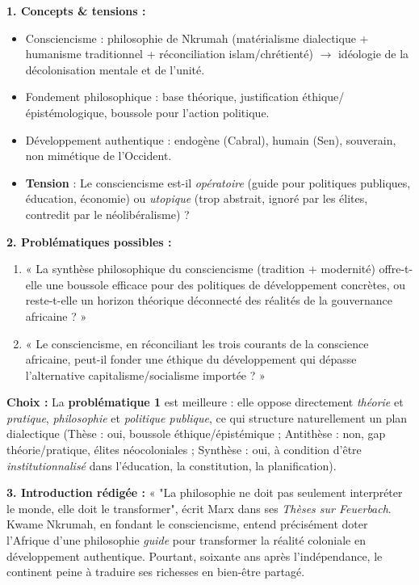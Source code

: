 \documentclass[11pt]{article}
\newcommand{\cle}[1]{{\popxbold\color{popdark}#1}}
\begin{document}
\begin{corrige}
\textbf{1. Concepts \& tensions :}
\begin{itemize}
    \item \cle{Consciencisme} : philosophie de Nkrumah (matérialisme dialectique + humanisme traditionnel + réconciliation islam/chrétienté) $\rightarrow$ idéologie de la décolonisation mentale et de l'unité.
    \item \cle{Fondement philosophique} : base théorique, justification éthique/épistémologique, boussole pour l'action politique.
    \item \cle{Développement authentique} : endogène (Cabral), humain (Sen), souverain, non mimétique de l'Occident.
    \item \textbf{Tension} : Le consciencisme est-il \emph{opératoire} (guide pour politiques publiques, éducation, économie) ou \emph{utopique} (trop abstrait, ignoré par les élites, contredit par le néolibéralisme) ?
\end{itemize}

\textbf{2. Problématiques possibles :}
\begin{enumerate}
    \item « La synthèse philosophique du consciencisme (tradition + modernité) offre-t-elle une boussole efficace pour des politiques de développement concrètes, ou reste-t-elle un horizon théorique déconnecté des réalités de la gouvernance africaine ? »
    \item « Le consciencisme, en réconciliant les trois courants de la conscience africaine, peut-il fonder une éthique du développement qui dépasse l'alternative capitalisme/socialisme importée ? »
\end{enumerate}
\textbf{Choix :} La \textbf{problématique 1} est meilleure : elle oppose directement \emph{théorie} et \emph{pratique}, \emph{philosophie} et \emph{politique publique}, ce qui structure naturellement un plan dialectique (Thèse : oui, boussole éthique/épistémique ; Antithèse : non, gap théorie/pratique, élites néocoloniales ; Synthèse : oui, à condition d'être \emph{institutionnalisé} dans l'éducation, la constitution, la planification).

\textbf{3. Introduction rédigée :}
« "La philosophie ne doit pas seulement interpréter le monde, elle doit le transformer", écrit Marx dans ses \textit{Thèses sur Feuerbach}. Kwame Nkrumah, en fondant le consciencisme, entend précisément doter l'Afrique d'une philosophie \emph{guide} pour transformer la réalité coloniale en développement authentique. Pourtant, soixante ans après l'indépendance, le continent peine à traduire ses richesses en bien-être partagé.


\end{corrige}
\end{document}
